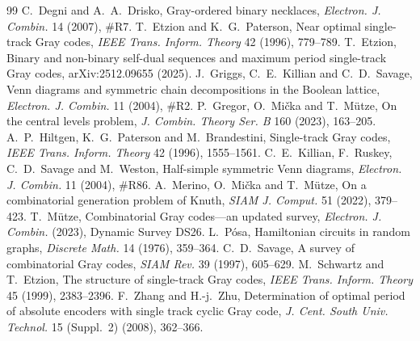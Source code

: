 \documentclass[journal,onecolumn,11pt]{IEEEtran}
\begin{document}
\begin{thebibliography}{99}
 C.~Degni and A.~A.~Drisko, Gray-ordered binary necklaces, \emph{Electron. J. Combin.} 14 (2007),
\#R7.
 T.~Etzion and K.~G.~Paterson, Near optimal single-track Gray codes, \emph{IEEE Trans. Inform. Theory}
42 (1996), 779--789.
 T.~Etzion, Binary and non-binary self-dual sequences and maximum period single-track Gray codes,
arXiv:2512.09655 (2025).
 J.~Griggs, C.~E.~Killian and C.~D.~Savage, Venn diagrams and symmetric chain decompositions in the
Boolean lattice, \emph{Electron. J. Combin.} 11 (2004), \#R2.
 P.~Gregor, O.~Mi\v{c}ka and T.~M\"utze, On the central levels problem, \emph{J. Combin. Theory Ser. B} 160
(2023), 163--205.
 A.~P.~Hiltgen, K.~G.~Paterson and M.~Brandestini, Single-track Gray codes, \emph{IEEE Trans. Inform.
Theory} 42 (1996), 1555--1561.
 C.~E.~Killian, F.~Ruskey, C.~D.~Savage and M.~Weston, Half-simple symmetric Venn diagrams,
\emph{Electron. J. Combin.} 11 (2004), \#R86.
 A.~Merino, O.~Mi\v{c}ka and T.~M\"utze, On a combinatorial generation problem of Knuth, \emph{SIAM J. Comput.}
51 (2022), 379--423.
 T.~M\"utze, Combinatorial Gray codes---an updated survey, \emph{Electron. J. Combin.} (2023), Dynamic
Survey DS26.
 L.~P\'osa, Hamiltonian circuits in random graphs, \emph{Discrete Math.} 14 (1976), 359--364.
 C.~D.~Savage, A survey of combinatorial Gray codes, \emph{SIAM Rev.} 39 (1997), 605--629.
 M.~Schwartz and T.~Etzion, The structure of single-track Gray codes, \emph{IEEE Trans. Inform. Theory}
45 (1999), 2383--2396.
 F.~Zhang and H.-j.~Zhu, Determination of optimal period of absolute encoders with single track cyclic
Gray code, \emph{J. Cent. South Univ. Technol.} 15 (Suppl.~2) (2008), 362--366.
\end{thebibliography}
\end{document}
